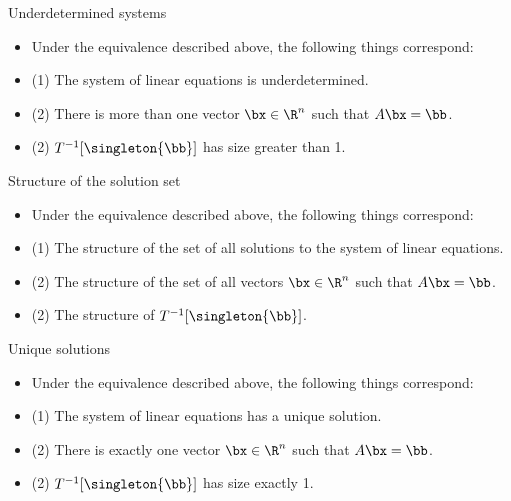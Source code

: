 \documentclass{beamer}
\begin{document}

\begin{frame}{Underdetermined systems}

\begin{itemize}
\item Under the equivalence described above, the following things correspond:
\item (1) The system of linear equations is underdetermined.
\item (2) There is more than one vector $\bx \in \R^n$ such that $A \bx = \bb$.
\item (2) $T^{-1}[\singleton{\bb}]$ has size greater than 1.
\end{itemize}

\end{frame}


\begin{frame}{Structure of the solution set}

\begin{itemize}
\item Under the equivalence described above, the following things correspond:
\item (1) The structure of the set of all solutions to the system of linear equations.
\item (2) The structure of the set of all vectors $\bx \in \R^n$ such that $A \bx = \bb$.
\item (2) The structure of $T^{-1}[\singleton{\bb}]$.
\end{itemize}

\end{frame}


\begin{frame}{Unique solutions}

\begin{itemize}
\item Under the equivalence described above, the following things correspond:
\item (1) The system of linear equations has a unique solution.
\item (2) There is exactly one vector $\bx \in \R^n$ such that $A \bx = \bb$.
\item (2) $T^{-1}[\singleton{\bb}]$ has size exactly 1.
\end{itemize}

\end{frame}
\end{document}
